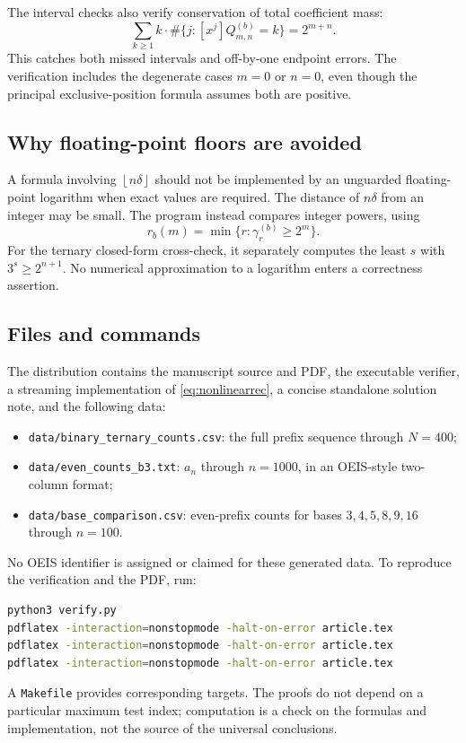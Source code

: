 \documentclass[11pt,letterpaper]{article}
\numberwithin{equation}{section}
\theoremstyle{definition}
\theoremstyle{remark}
\newcommand{\floor}[1]{\left\lfloor#1\right\rfloor}
\begin{document}
The interval checks also verify conservation of total coefficient mass:
\[
 \sum_{k\ge1}k\cdot\#\{j:[x^j]Q_{m,n}^{(b)}=k\}=2^{m+n}.
\]
This catches both missed intervals and off-by-one endpoint errors. The verification includes the degenerate cases $m=0$ or $n=0$, even though the principal exclusive-position formula assumes both are positive.

\subsection{Why floating-point floors are avoided}
A formula involving $\floor{n\delta}$ should not be implemented by an unguarded floating-point logarithm when exact values are required. The distance of $n\delta$ from an integer may be small. The program instead compares integer powers, using
\[
 r_b(m)=\min\{r:\gamma_r^{(b)}\ge2^m\}.
\]
For the ternary closed-form cross-check, it separately computes the least $s$ with $3^s\ge2^{n+1}$. No numerical approximation to a logarithm enters a correctness assertion.

\subsection{Files and commands}
The distribution contains the manuscript source and PDF, the executable verifier, a streaming implementation of \eqref{eq:nonlinearrec}, a concise standalone solution note, and the following data:
\begin{itemize}
\item \texttt{data/binary\_ternary\_counts.csv}: the full prefix sequence through $N=400$;
\item \texttt{data/even\_counts\_b3.txt}: $a_n$ through $n=1000$, in an OEIS-style two-column format;
\item \texttt{data/base\_comparison.csv}: even-prefix counts for bases $3,4,5,8,9,16$ through $n=100$.
\end{itemize}
No OEIS identifier is assigned or claimed for these generated data. To reproduce the verification and the PDF, run:
\begin{lstlisting}[language=bash]
python3 verify.py
pdflatex -interaction=nonstopmode -halt-on-error article.tex
pdflatex -interaction=nonstopmode -halt-on-error article.tex
pdflatex -interaction=nonstopmode -halt-on-error article.tex
\end{lstlisting}
A \texttt{Makefile} provides corresponding targets. The proofs do not depend on a particular maximum test index; computation is a check on the formulas and implementation, not the source of the universal conclusions.
\end{document}
